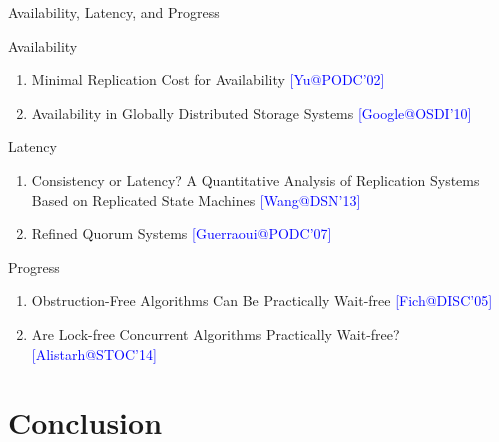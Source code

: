 \documentclass{beamer}
\makeatletter
\newcommand{\citeinbeamer}[3]{{\scriptsize{\textcolor{blue}{[#1@#2'#3]}}}}
\makeatother
\begin{document}
\begin{frame}{Availability, Latency, and Progress}

{\small
  \begin{block}{Availability}
  \begin{enumerate}
    \item Minimal Replication Cost for Availability \citeinbeamer{Yu}{PODC}{02}
    \item Availability in Globally Distributed Storage Systems
    \citeinbeamer{Google}{OSDI}{10}
  \end{enumerate}
  \end{block}

  \vspace{-0.2cm}
  \begin{block}{Latency}
    \begin{enumerate}
      \item Consistency or Latency? A Quantitative Analysis of Replication
      Systems Based on Replicated State Machines \citeinbeamer{Wang}{DSN}{13}
      \item Refined Quorum Systems \citeinbeamer{Guerraoui}{PODC}{07}
    \end{enumerate}
  \end{block}

  \vspace{-0.2cm}
  \begin{block}{Progress}
    \begin{enumerate}
      \item Obstruction-Free Algorithms Can Be Practically
      Wait-free {\tiny{\textcolor{blue}{[Fich@DISC'05]}}}
      \item Are Lock-free Concurrent Algorithms Practically
      Wait-free?
      \citeinbeamer{Alistarh}{STOC}{14}
    \end{enumerate}
  \end{block}
}
\end{frame}
\section{Conclusion}
\end{document}
